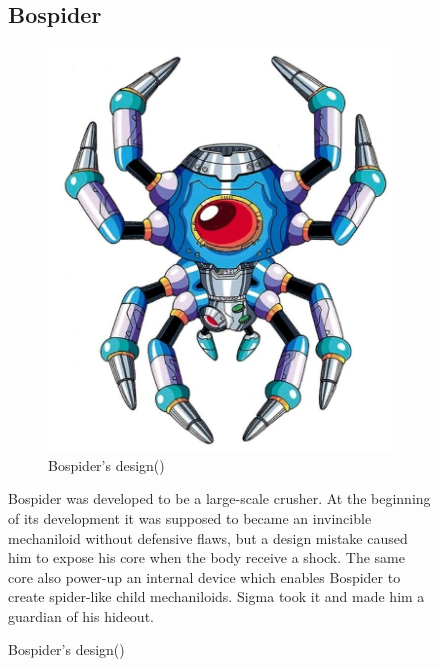 \begin{figure}[htp]

\subsection{Bospider}\label{boss:bospider}
\begin{figure}[htp]
	\centering
	\includegraphics[width=0.35\linewidth]{figures/X1/Sigma_stages/Bospider.jpg}
	\caption{Bospider's design(\cite{book:MMX_Complete_art})}
\end{figure}
Bospider was developed to be a large-scale crusher. At the beginning of its development it was supposed to became an invincible mechaniloid without defensive flaws, but a design mistake caused him to expose his core when the body receive a shock. The same core also power-up an internal device which enables Bospider to create spider-like child mechaniloids\cite{wayback:X_resources}. Sigma took it and made him a guardian of his hideout.


\end{figure}
